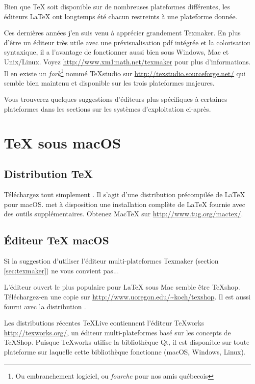 Bien que \TeX{} soit disponible sur de nombreuses plateformes
différentes, les éditeurs \LaTeX{} ont longtemps été chacun restreints
à une plateforme donnée.

Ces dernières années j'en suis venu à apprécier grandement Texmaker.
En plus d'être un éditeur très utile avec une prévisualisation pdf
intégrée et la colorisation syntaxique, il a l'avantage de fonctionner
aussi bien sous Windows, Mac et Unix/Linux. Voyez
\url{http://www.xm1math.net/texmaker} pour plus d'informations.
Il en existe un \emph{fork}\footnote{Ou embranchement
  logiciel, ou \emph{fourche} pour nos amis québecois} nommé TeXstudio
sur \url{http://texstudio.sourceforge.net/} qui semble bien maintenu
et disponible sur les trois plateformes majeures.

Vous trouverez quelques suggestions d'éditeurs plus spécifiques à
certaines plateformes dans les sections sur les systèmes
d'exploitation ci-après.

\section{\TeX{} sous macOS}

\subsection{Distribution \TeX{}}

Téléchargez tout simplement . Il s'agit d'une distribution
précompilée de \LaTeX{} pour macOS.  met à disposition
une installation complète de \LaTeX{} fournie avec des outils
supplémentaires. Obtenez Mac\TeX{} sur \url{http://www.tug.org/mactex/}.

\subsection{Éditeur \TeX{} macOS}

Si la suggestion d'utiliser l'éditeur multi-plateformes Texmaker
(section \ref{sec:texmaker}) ne vous convient pas...

L'éditeur ouvert le plus populaire pour \LaTeX{} sous Mac semble être
\TeX{}shop. Téléchargez-en une copie sur
\url{http://www.uoregon.edu/~koch/texshop}. Il est aussi fourni avec
la distribution .

Les distributions récentes \TeX Live contiennent l'éditeur \TeX{}works
\url{http://texworks.org/}, un éditeur multi-plateformes basé sur les
concepts de \TeX{}Shop. Puisque \TeX{}works utilise la bibliothèque
Qt, il est disponible sur toute plateforme sur laquelle cette
bibliothèque fonctionne (macOS, Windows, Linux).

